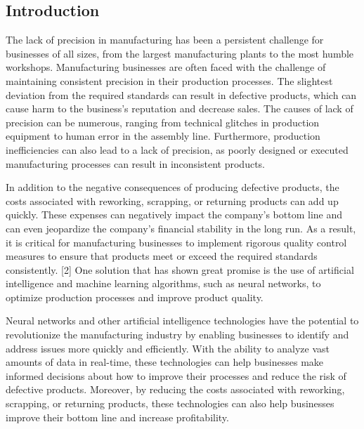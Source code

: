 %
%
 \newpage
\setcounter{page}{1}
\begin{center}
\section*{Introduction}
\end{center}
The lack of precision in manufacturing has been a persistent challenge for businesses of all sizes, from the largest manufacturing plants to the most humble workshops.
Manufacturing businesses are often faced with the challenge of maintaining consistent precision in their production processes. The slightest deviation from the required standards can result in defective products, which can cause harm to the business's reputation and decrease sales. The causes of lack of precision can be numerous, ranging from technical glitches in production equipment to human error in the assembly line. Furthermore, production inefficiencies can also lead to a lack of precision, as poorly designed or executed manufacturing processes can result in inconsistent products.

In addition to the negative consequences of producing defective products, the costs associated with reworking, scrapping, or returning products can add up quickly. These expenses can negatively impact the company's bottom line and can even jeopardize the company's financial stability in the long run. As a result, it is critical for manufacturing businesses to implement rigorous quality control measures to ensure that products meet or exceed the required standards consistently. [2]
One solution that has shown great promise is the use of artificial intelligence and machine learning algorithms, such as neural networks, to optimize production processes and improve product quality. 

Neural networks and other artificial intelligence technologies have the potential to revolutionize the manufacturing industry by enabling businesses to identify and address issues more quickly and efficiently. With the ability to analyze vast amounts of data in real-time, these technologies can help businesses make informed decisions about how to improve their processes and reduce the risk of defective products. Moreover, by reducing the costs associated with reworking, scrapping, or returning products, these technologies can also help businesses improve their bottom line and increase profitability. 


